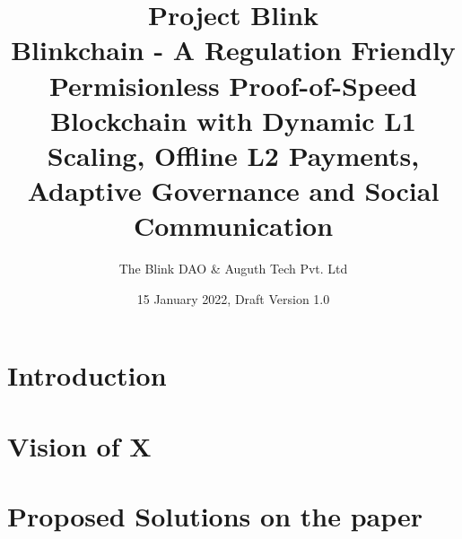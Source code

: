 \documentclass[letterpaper,11pt]{article}
\title{\textbf{Project Blink}\\
\vspace{3mm}
Blinkchain - A Regulation Friendly Permisionless Proof-of-Speed Blockchain with Dynamic L1 Scaling, Offline L2 Payments, Adaptive Governance and Social Communication}
\date{15 January 2022, Draft Version 1.0}
\author[1]{The Blink DAO \& Auguth Tech Pvt. Ltd}
\begin{document}
\maketitle

\begin{abstract}

\lipsum[1]

\end{abstract}


\section{Introduction}

\section{Vision of X}

\section{Proposed Solutions on the paper}
\end{document}
